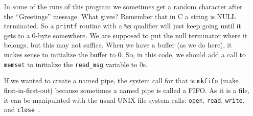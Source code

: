 In some of the runs of this program we sometimes get a random character after the ``Greetings'' message. What gives? Remember that in C a string is NULL terminated. So a \texttt{printf} routine with a \texttt{\%s} qualifier will just keep going until it gets to a 0-byte somewhere. We are supposed to put the null terminator where it belongs, but this may not suffice. When we have a buffer (as we do here), it makes sense to initialize the buffer to 0. So, in this code, we should add a call to \texttt{memset} to initialize the \texttt{read\_msg} variable to 0s. 

If we wanted to create a named pipe, the system call for that is \texttt{mkfifo} (make first-in-first-out) because sometimes a named pipe is called a FIFO. As it is a file, it can be manipulated with the usual UNIX file system calls: \texttt{open}, \texttt{read}, \texttt{write}, and \texttt{close}~\cite{osc}.



